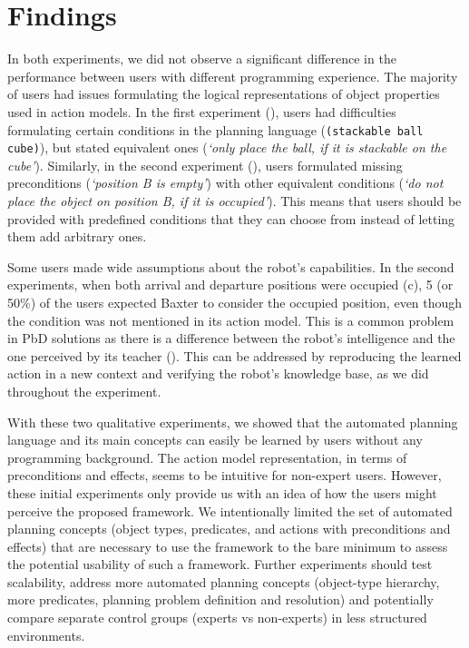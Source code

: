 




%

\section{Findings}
In both experiments, we did not observe a significant difference in the performance between users with different programming experience. 
The majority of users had issues formulating the logical representations of object properties used in action models. 
In the first experiment (), users had difficulties formulating certain conditions in the planning language (\eg \texttt{(stackable ball cube)}), but stated equivalent ones (\eg \textit{`only place the ball, if it is stackable on the cube'}).
Similarly, in the second experiment (), users formulated missing preconditions (\eg \textit{`position B is empty'}) with other equivalent conditions (\eg \textit{`do not place the object on position B, if it is occupied'}). 
This means that users should be provided with predefined conditions that they can choose from instead of letting them add arbitrary ones.

Some users made wide assumptions about the robot's capabilities. 
In the second experiments, when both arrival and departure positions were occupied (c), 5 (or 50\%) of the users expected Baxter to consider the occupied position, even though the condition was not mentioned in its action model.
This is a common problem in PbD solutions as there is a difference between the robot's intelligence and the one perceived by its teacher (\cite{suay2012practical}).
This can be addressed by reproducing the learned action in a new context and verifying the robot's knowledge base, as we did throughout the experiment.

With these two qualitative experiments, we showed that the automated planning language and its main concepts can easily be learned by users without any programming background. 
The action model representation, in terms of preconditions and effects, seems to be intuitive for non-expert users. 
However, these initial experiments only provide us with an idea of how the users might perceive the proposed framework. 
We intentionally limited the set of automated planning concepts (\ie object types, predicates, and actions with preconditions and effects) that are necessary to use the framework to the bare minimum to assess the potential usability of such a framework. 
Further experiments should test scalability, address more automated planning concepts (\eg object-type hierarchy, more predicates, planning problem definition and resolution) and potentially compare separate control groups (\eg experts vs non-experts) in less structured environments.

